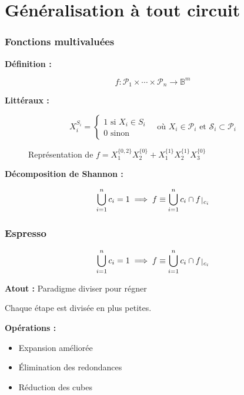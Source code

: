 \documentclass[handout]{beamer}
\newcommand{\ens}[1]{{\lbrace{} #1 \rbrace{}}}
\def\restriction#1#2{\mathchoice
              {\setbox1\hbox{${\displaystyle #1}_{\scriptstyle #2}$}
              \restrictionaux{#1}{#2}}
              {\setbox1\hbox{${\textstyle #1}_{\scriptstyle #2}$}
              \restrictionaux{#1}{#2}}
              {\setbox1\hbox{${\scriptstyle #1}_{\scriptscriptstyle #2}$}
              \restrictionaux{#1}{#2}}
              {\setbox1\hbox{${\scriptscriptstyle #1}_{\scriptscriptstyle #2}$}
              \restrictionaux{#1}{#2}}}
\def\restrictionaux#1#2{{#1\,\smash{\vrule height .8\ht1 depth .85\dp1}}_{\,#2}}
\begin{document}
\section{Généralisation à tout circuit}
\begin{frame}
  \frametitle{Fonctions multivaluées}

  \textbf{Définition :}
  \begin{mdframed}
  \[ f: \mathcal{P}_1 \times \cdots \times \mathcal{P}_n \longrightarrow \mathbb{B}^m \]
  \end{mdframed}

  \textbf{Littéraux :} 
  \begin{mdframed}
  \[{X_i^{S_i} = %
  \begin{cases}
    1 \text{ si } X_i \in S_i \\
    0 \text{ sinon}
  \end{cases}
  \quad \text{où } X_i \in \mathcal{P}_i \text{ et } \mathcal{S}_i \subset \mathcal{P}_i} \]
    \end{mdframed}  
  
  
  \begin{figure}
  \centering
	  \begin{tikzpicture}[scale=2]  
  		
	  \end{tikzpicture}
	  \caption{Représentation de $f = X_1^\ens{0,2} X_2^\ens{0} + X_1^\ens{1} X_2^\ens{1}X_3^\ens{0}$}
	\end{figure}

  \textbf{Décomposition de Shannon :}
  \begin{mdframed}
  \[ \bigcup_{i=1}^n c_i = 1 \implies f \equiv \bigcup_{i=1}^{n} c_i \cap \restriction{f}{c_i} \]
  \end{mdframed}

\end{frame}

\begin{frame}
  \frametitle{Espresso}

  \[ \bigcup_{i=1}^n c_i = 1 \implies f \equiv \bigcup_{i=1}^{n} c_i \cap \restriction{f}{c_i}\]

  \textbf{Atout :} Paradigme diviser pour régner
  \par Chaque étape est divisée en plus petites.
	
  \textbf{Opérations :}  
  \begin{itemize}
  \item Expansion améliorée
  \item Élimination des redondances
  \item Réduction des cubes
  \end{itemize}
  
  
  
\end{frame}
\end{document}
